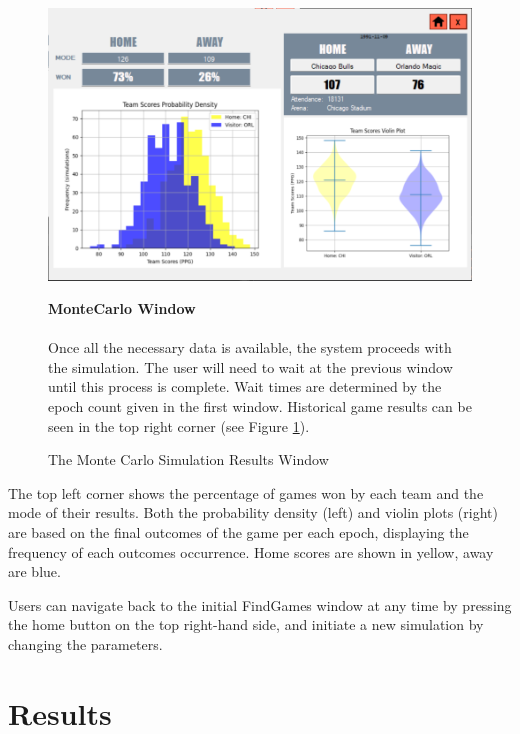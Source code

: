 \documentclass{thesis-ekf}
\theoremstyle{definition}
\theoremstyle{remark}
\begin{document}
\begin{figure}[H]
	\begin{minipage}{0.69\textwidth}
		\centering
		\includegraphics[width=\textwidth]{img/user-guide/MonteCarlo}
		\caption{The Monte Carlo Simulation Results Window}
		\label{img-montecarlo}
	\end{minipage}
	\hfill
	\begin{minipage}{0.28\textwidth}
		\textbf{MonteCarlo Window} \\ \\
		Once all the necessary data is available, the system proceeds with the simulation. The user will need to wait at the previous window until this process is complete. Wait times are determined by the epoch count given in the first window. 
		Historical game results can be seen in the top right corner (see Figure \ref{img-montecarlo}). 
	\end{minipage}
\end{figure}


The top left corner shows the percentage of games won by each team and the mode of their results. Both the probability density (left) and violin plots (right) are based on the final outcomes of the game per each epoch, displaying the frequency of each outcomes occurrence. Home scores are shown in yellow, away are blue.

Users can navigate back to the initial FindGames window at any time by pressing the home button on the top right-hand side, and initiate a new simulation by changing the parameters.


\chapter{Results}
\end{document}
